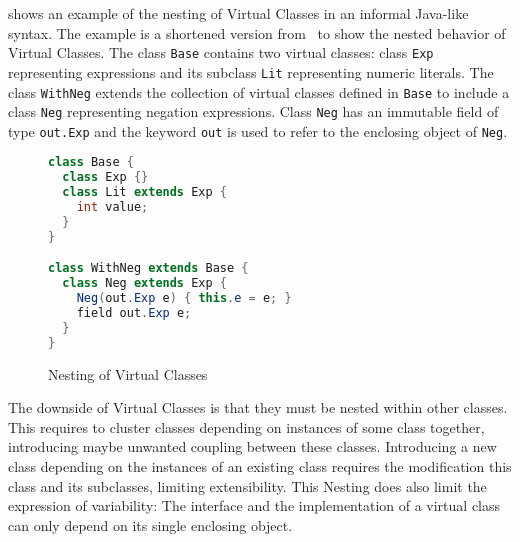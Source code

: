 shows an example
of the nesting of Virtual Classes in an informal Java-like syntax.
The example is a shortened version from~\cite{virtual:classes}
to show the nested behavior of Virtual Classes.
The class \lstinline{Base} contains two virtual classes:
class \lstinline{Exp} representing expressions
and its subclass \lstinline{Lit} representing numeric literals.
The class \lstinline{WithNeg} extends the collection of
virtual classes defined in \lstinline{Base} to include
a class \lstinline{Neg} representing negation expressions.
Class \lstinline{Neg} has an immutable field of type \lstinline[keywords={out}]{out.Exp}
and the keyword \lstinline[keywords={out}]{out} is used to refer to
the enclosing object of \lstinline{Neg}.

\begin{figure}
\begin{lstlisting}[language=java,morekeywords={out,field}]
class Base {
  class Exp {}
  class Lit extends Exp {
    int value;
  }
}

class WithNeg extends Base {
  class Neg extends Exp {
    Neg(out.Exp e) { this.e = e; }
    field out.Exp e;
  }
}
\end{lstlisting}
\caption{Nesting of Virtual Classes}
\label{fig:virtual-classes-ex}
\end{figure}


The downside of Virtual Classes is that they must be nested within other classes.
This requires to cluster classes depending on instances of some class together,
introducing maybe unwanted coupling between these classes.
Introducing a new class depending on the instances of an existing class
requires the modification this class and its subclasses,
limiting extensibility.
This Nesting does also limit the expression of variability:
The interface and the implementation of a virtual class can only depend
on its single enclosing object.

